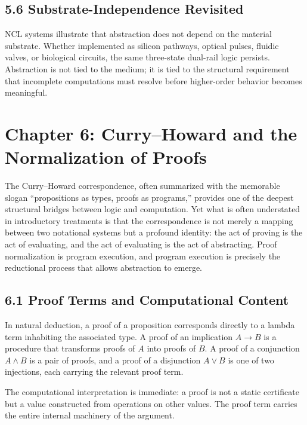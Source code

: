 \documentclass[12pt,letterpaper]{article}
\begin{document}
\subsection{5.6 Substrate-Independence Revisited}

NCL systems illustrate that abstraction does not depend on the material substrate. Whether implemented as silicon pathways, optical pulses, fluidic valves, or biological circuits, the same three-state dual-rail logic persists. Abstraction is not tied to the medium; it is tied to the structural requirement that incomplete computations must resolve before higher-order behavior becomes meaningful.

\newpage

\section{Chapter 6: Curry--Howard and the Normalization of Proofs}

The Curry--Howard correspondence, often summarized with the memorable slogan ``propositions as types, proofs as programs,'' provides one of the deepest structural bridges between logic and computation. Yet what is often understated in introductory treatments is that the correspondence is not merely a mapping between two notational systems but a profound identity: the act of proving is the act of evaluating, and the act of evaluating is the act of abstracting. Proof normalization is program execution, and program execution is precisely the reductional process that allows abstraction to emerge.

\subsection{6.1 Proof Terms and Computational Content}

In natural deduction, a proof of a proposition corresponds directly to a lambda term inhabiting the associated type. A proof of an implication \(A \to B\) is a procedure that transforms proofs of \(A\) into proofs of \(B\). A proof of a conjunction \(A \land B\) is a pair of proofs, and a proof of a disjunction \(A \lor B\) is one of two injections, each carrying the relevant proof term.

The computational interpretation is immediate: a proof is not a static certificate but a value constructed from operations on other values. The proof term carries the entire internal machinery of the argument.
\end{document}
